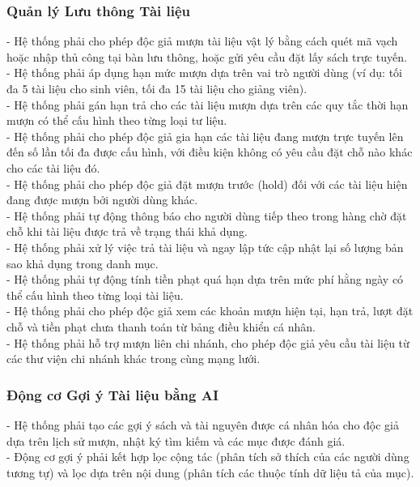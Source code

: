 \subsubsection{Quản lý Lưu thông Tài liệu}
- Hệ thống phải cho phép độc giả mượn tài liệu vật lý bằng cách quét mã vạch hoặc nhập thủ công tại bàn lưu thông, hoặc gửi yêu cầu đặt lấy sách trực tuyến.\\
- Hệ thống phải áp dụng hạn mức mượn dựa trên vai trò người dùng (ví dụ: tối đa 5 tài liệu cho sinh viên, tối đa 15 tài liệu cho giảng viên).\\
- Hệ thống phải gán hạn trả cho các tài liệu mượn dựa trên các quy tắc thời hạn mượn có thể cấu hình theo từng loại tư liệu.\\
- Hệ thống phải cho phép độc giả gia hạn các tài liệu đang mượn trực tuyến lên đến số lần tối đa được cấu hình, với điều kiện không có yêu cầu đặt chỗ nào khác cho các tài liệu đó.\\
- Hệ thống phải cho phép độc giả đặt mượn trước (hold) đối với các tài liệu hiện đang được mượn bởi người dùng khác.\\
- Hệ thống phải tự động thông báo cho người dùng tiếp theo trong hàng chờ đặt chỗ khi tài liệu được trả về trạng thái khả dụng.\\
- Hệ thống phải xử lý việc trả tài liệu và ngay lập tức cập nhật lại số lượng bản sao khả dụng trong danh mục.\\
- Hệ thống phải tự động tính tiền phạt quá hạn dựa trên mức phí hằng ngày có thể cấu hình theo từng loại tài liệu.\\
- Hệ thống phải cho phép độc giả xem các khoản mượn hiện tại, hạn trả, lượt đặt chỗ và tiền phạt chưa thanh toán từ bảng điều khiển cá nhân.\\
- Hệ thống phải hỗ trợ mượn liên chi nhánh, cho phép độc giả yêu cầu tài liệu từ các thư viện chi nhánh khác trong cùng mạng lưới.\\

\subsubsection{Động cơ Gợi ý Tài liệu bằng AI}
- Hệ thống phải tạo các gợi ý sách và tài nguyên được cá nhân hóa cho độc giả dựa trên lịch sử mượn, nhật ký tìm kiếm và các mục được đánh giá.\\
- Động cơ gợi ý phải kết hợp lọc cộng tác (phân tích sở thích của các người dùng tương tự) và lọc dựa trên nội dung (phân tích các thuộc tính dữ liệu tả của mục).\\

